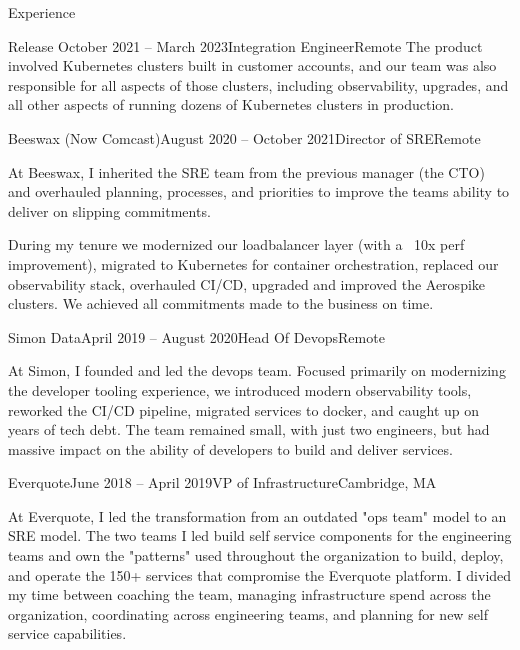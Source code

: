 \documentclass{resume} %
\begin{document}
\begin{rSection}{Experience}
\begin{rSubsection}{Release }{October 2021 -- March 2023}{Integration Engineer}{Remote}
The product involved Kubernetes clusters built in customer accounts, and our team was also responsible for all aspects of those clusters, including observability, upgrades, and all other aspects of running dozens of Kubernetes clusters in production.
\end{rSubsection}

\begin{rSubsection}{Beeswax (Now Comcast)}{August 2020 -- October 2021}{Director of SRE}{Remote}
\item[]At Beeswax, I inherited the SRE team from the previous manager (the CTO) and overhauled planning, processes, and priorities to improve the teams ability to deliver on slipping commitments.

During my tenure we modernized our loadbalancer layer (with a ~10x perf improvement), migrated to Kubernetes for container orchestration, replaced our observability stack, overhauled CI/CD, upgraded and improved the Aerospike clusters.  We achieved all commitments made to the business on time.
\end{rSubsection}

\begin{rSubsection}{Simon Data}{April 2019 -- August 2020}{Head Of Devops}{Remote}
\item[]At Simon, I founded and led the devops team. Focused primarily on modernizing the developer tooling experience, we introduced modern observability tools, reworked the CI/CD pipeline, migrated services to docker, and caught up on years of tech debt.  The team remained small, with just two engineers, but had massive impact on the ability of developers to build and deliver services.
\end{rSubsection}

\begin{rSubsection}{Everquote}{June 2018 -- April 2019}{VP of Infrastructure}{Cambridge, MA}
\item[] At Everquote, I led the transformation from an outdated "ops team" model to an
  SRE model.  The two teams I led build self service components for the engineering
  teams and own the "patterns" used throughout the organization to build, deploy, and
  operate the 150+ services that compromise the Everquote platform.  I divided my time
  between coaching the team, managing infrastructure spend across the
  organization, coordinating across engineering teams, and planning for new
  self service capabilities.
\end{rSubsection}


\end{rSection}
\end{document}
